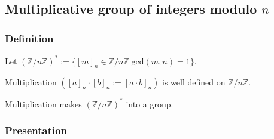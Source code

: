 \subsection{Multiplicative group of integers modulo $n$}\label{multiplicativegroupofintegersmodn}

\subsubsection{Definition}
Let $(\mathbb{Z} / n \mathbb{Z})^* := \{[m]_n \in \mathbb{Z} / n \mathbb{Z} | \textrm{gcd}(m,n)=1 \}.$

\begin{lemma}
Multiplication $([a]_n \cdot [b]_n := [a \cdot b]_n)$ is well defined on $\mathbb{Z} / n \mathbb{Z}$.
\end{lemma}

\begin{proposition}
Multiplication makes $(\mathbb{Z} / n \mathbb{Z})^*$ into a group.
\end{proposition}

\subsubsection{Presentation}